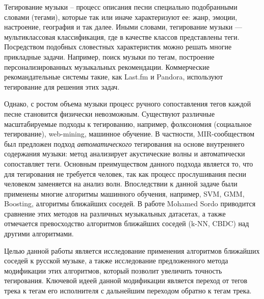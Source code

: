\startprefacepage	

Тегирование музыки -- процесс описания песни специально подобранными словами (тегами), которые так или иначе характеризуют ее: жанр, эмоции, настроение, география и так далее.
Иными словами, тегирование музыки {{---}} мультиклассовая классификация, где в качестве классов представлены теги.
Посредством подобных словестных характеристик можно решать многие прикладные задачи. Например, поиск музыки по тегам, построение персонализированных музыкальных рекомендации.
Коммерческие рекомандательные системы такие, как Last.fm и Pandora, используют тегирование для решения этих задач. 

Однако, с ростом объема музыки процесс ручного сопоставления 
тегов каждой песне становится физически невозможным. Существуют различные масштабируемые подходы к тегированию, например, фолксономия (социальное тегирование), web-mining, машинное обучение. 
В частности, MIR-сообществом был предложен подход \emph{автоматического} тегирования на основе внутреннего содержания музыки: метод анализирует акустические волны и автоматически сопоставляет теги. 
Основным преимуществом данного подхода является то, что для тегирования не требуется человек, так как процесс прослушивания песни человеком заменяется на анализ волн.
Впоследствии к данной задаче были применены многие алгоритмы машинного обучения, например, SVM, GMM, Boosting, алгоритмы ближайших соседей. 
В работе Mohamed Sordo приводится сравнение этих методов на различных музыкальных датасетах, а также отмечается превосходство алгоритмов ближайших соседей (k-NN, CBDC) над другими алгоритмами.

Целью данной работы является исследование применения алгоритмов ближайших соседей к русской музыке, а также исследование предложенного метода модификации этих алгоритмов, который
позволит увеличить точность тегирования.
Ключевой идеей данной модификации является переход от тегов трека к тегам его исполнителя с дальнейшим переходом обратно к тегам трека.